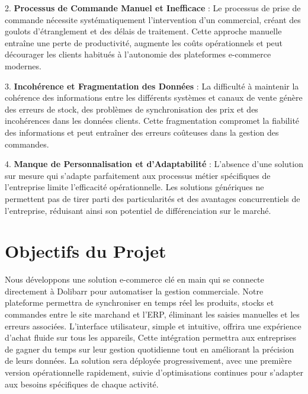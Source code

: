 \documentclass[12pt,a4paper]{report}
\begin{document}
2. \textbf{Processus de Commande Manuel et Inefficace} : Le processus de prise de commande nécessite systématiquement l'intervention d'un commercial, créant des goulots d'étranglement et des délais de traitement. Cette approche manuelle entraîne une perte de productivité, augmente les coûts opérationnels et peut décourager les clients habitués à l'autonomie des plateformes e-commerce modernes.

3. \textbf{Incohérence et Fragmentation des Données} : La difficulté à maintenir la cohérence des informations entre les différents systèmes et canaux de vente génère des erreurs de stock, des problèmes de synchronisation des prix et des incohérences dans les données clients. Cette fragmentation compromet la fiabilité des informations et peut entraîner des erreurs coûteuses dans la gestion des commandes.

4. \textbf{Manque de Personnalisation et d'Adaptabilité} : L'absence d'une solution sur mesure qui s'adapte parfaitement aux processus métier spécifiques de l'entreprise limite l'efficacité opérationnelle. Les solutions génériques ne permettent pas de tirer parti des particularités et des avantages concurrentiels de l'entreprise, réduisant ainsi son potentiel de différenciation sur le marché.



\section{Objectifs du Projet}

Nous développons une solution e-commerce clé en main qui se connecte directement à Dolibarr pour automatiser la gestion commerciale. Notre plateforme permettra de synchroniser en temps réel les produits, stocks et commandes entre le site marchand et l'ERP, éliminant les saisies manuelles et les erreurs associées. L'interface utilisateur, simple et intuitive, offrira une expérience d'achat fluide sur tous les appareils,  Cette intégration permettra aux entreprises de gagner du temps sur leur gestion quotidienne tout en améliorant la précision de leurs données. La solution sera déployée progressivement, avec une première version opérationnelle rapidement, suivie d'optimisations continues pour s'adapter aux besoins spécifiques de chaque activité.
\end{document}
